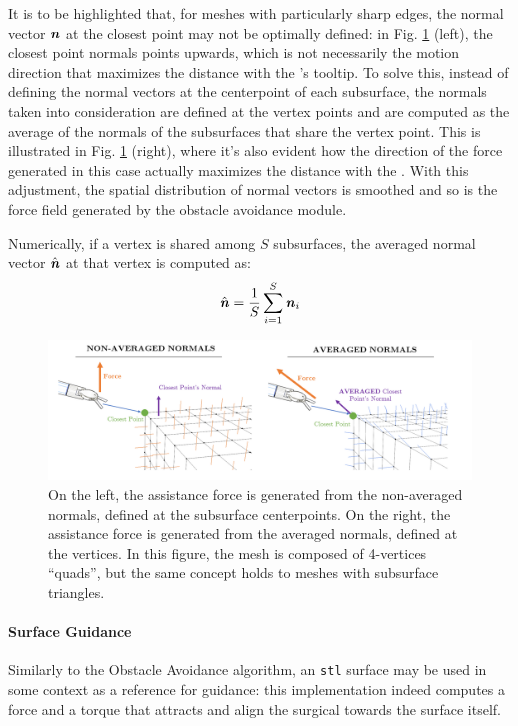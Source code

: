 \documentclass[../main.tex]{subfiles}
\begin{document}
It is to be highlighted that, for meshes with particularly sharp edges, the normal vector $\textbf{\textit{n}}$ at the closest point may not be optimally defined: in Fig. \ref{fig:normalsaveraging} (left), the closest point normals points upwards, which is not necessarily the motion direction that maximizes the distance with the \psm's tooltip. To solve this, instead of defining the normal vectors at the centerpoint of each subsurface, the normals taken into consideration are defined at the vertex points and are computed as the average of the normals of the subsurfaces that share the vertex point. This is illustrated in Fig. \ref{fig:normalsaveraging} (right), where it's also evident how the direction of the force generated in this case actually maximizes the distance with the \ee. With this adjustment, the spatial distribution of normal vectors is smoothed and so is the force field generated by the obstacle avoidance module.

Numerically, if a vertex is shared among $S$ subsurfaces, the averaged normal vector $\hat{\textbf{\textit{n}}}$ at that vertex is computed as:
\begin{equation}
    \hat{\textbf{\textit{n}}} = \frac{1}{S}\sum_{i=1}^{S} \textbf{\textit{n}}_i
    \label{eq:normalsaveraging}
\end{equation}


\begin{figure}
    \centering
    \includegraphics[width=\textwidth]{images/normals_averaging.png}
    \caption{On the left, the assistance force is generated from the non-averaged normals, defined at the subsurface centerpoints. On the right, the assistance force is generated from the averaged normals, defined at the vertices. In this figure, the mesh is composed of 4-vertices ``quads'', but the same concept holds to meshes with subsurface triangles.}
    \label{fig:normalsaveraging}
\end{figure}

\paragraph{Surface Guidance} Similarly to the Obstacle Avoidance algorithm, an \texttt{stl} surface may be used in some context as a reference for guidance: this implementation indeed computes a force and a torque that attracts and align the surgical \ee towards the surface itself. 
\end{document}
